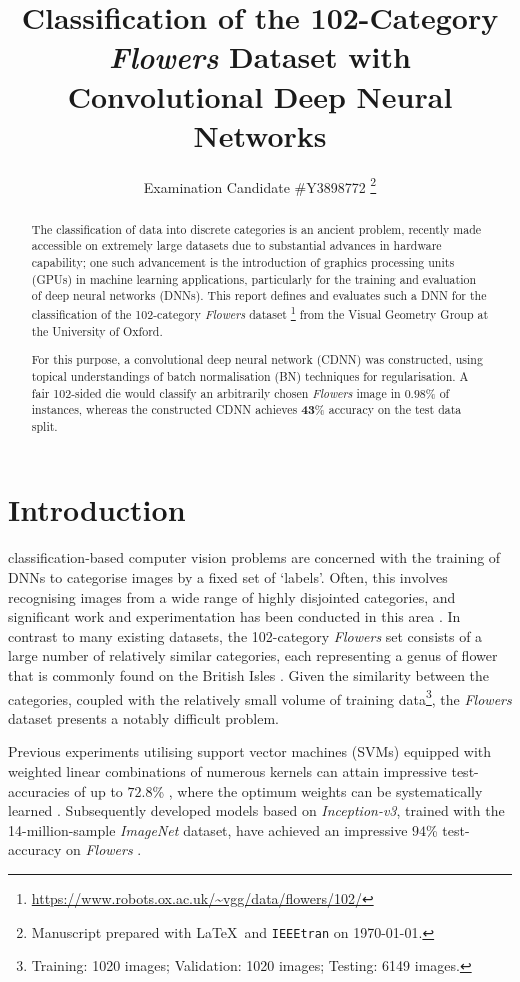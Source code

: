 \documentclass[journal]{IEEEtran}
\title{Classification of the 102-Category \emph{Flowers} Dataset with
    Convolutional Deep Neural Networks}
\author{Examination Candidate \#Y3898772%
    \thanks{Manuscript prepared with \LaTeX\ and \texttt{IEEEtran} on \today.}}
\newcommand\networkperformance{43}
\begin{document}
\maketitle
\begin{abstract}
    The classification of data into discrete categories is an ancient problem,
    recently made accessible on extremely large datasets due to substantial
    advances in hardware capability; one such advancement is the introduction of
    graphics processing units (GPUs) in machine learning applications,
    particularly for the training and evaluation of deep neural networks (DNNs).
    This report defines and evaluates such a DNN for the classification of the
    102-category \emph{Flowers} dataset%
    \footnote{\url{https://www.robots.ox.ac.uk/~vgg/data/flowers/102/}} from the
    Visual Geometry Group at the University of Oxford.

    For this purpose, a convolutional deep neural network (CDNN) was
    constructed, using topical understandings of batch normalisation (BN)
    techniques for regularisation. A fair 102-sided die would classify an
    arbitrarily chosen \emph{Flowers} image in $\mathbf{0.98}$\% of instances,
    whereas the constructed CDNN achieves $\mathbf{\networkperformance}$\%
    accuracy on the test data split.
\end{abstract}
\section{Introduction}
 classification-based computer vision problems are
concerned with the training of DNNs to categorise images by a fixed set of
`labels'. Often, this involves recognising images from a wide range of highly
disjointed categories, and significant work and experimentation has been
conducted in this area \cite{Chen:2021}. In contrast to many existing datasets,
the 102-category \emph{Flowers} set consists of a large number of relatively
similar categories, each representing a genus of flower that is commonly found
on the British Isles \cite{Nilsback:2008}. Given the similarity between the
categories, coupled with the relatively small volume of training
data\footnote{Training: 1020 images; Validation: 1020 images; Testing: 6149
images.}, the \emph{Flowers} dataset presents a notably difficult problem.

Previous experiments utilising support vector machines (SVMs) equipped with
weighted linear combinations of numerous kernels can attain impressive
test-accuracies of up to $72.8$\% \cite{Nilsback:2008}, where the optimum
weights can be systematically learned \cite{Varma:2007}. Subsequently developed
models based on \emph{Inception-v3}, trained with the 14-million-sample
\emph{ImageNet} dataset, have achieved an impressive $94$\% test-accuracy on
\emph{Flowers} \cite{Xia:2017}.
\end{document}
